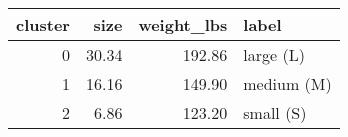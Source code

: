 \begin{tabular}{rrrl}
\toprule
 cluster &  size &  weight\_lbs &      label \\
\midrule
       0 & 30.34 &      192.86 &  large (L) \\
       1 & 16.16 &      149.90 & medium (M) \\
       2 &  6.86 &      123.20 &  small (S) \\
\bottomrule
\end{tabular}
